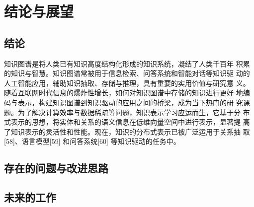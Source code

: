 \chapter{结论与展望}
\label{cha:conclusion}

\section{结论}




知识图谱是将人类已有知识高度结构化形成的知识系统，凝结了人类千百年 积累的知识与智慧。知识图谱常被用于信息检索、问答系统和智能对话等知识驱 动的人工智能应用，辅助知识抽取、存储与推理，具有重要的实用价值与研究意 义。随着互联网时代信息的爆炸性增长，如何对知识图谱中存储的知识进行更好 地编码与表示，构建知识图谱到知识驱动的应用之间的桥梁，成为当下热门的研 究课题。为了解决计算效率与数据稀疏等问题，知识表示学习应运而生，它基于分 布式表示的思想，将实体和关系的语义信息在低维向量空间中进行表示，显著提 高了知识表示的灵活性和性能。现在，知识的分布式表示已被广泛运用于关系抽 取[58]、语言模型[59] 和问答系统[60] 等知识驱动的任务中。



\section{存在的问题与改进思路}

\section{未来的工作}







